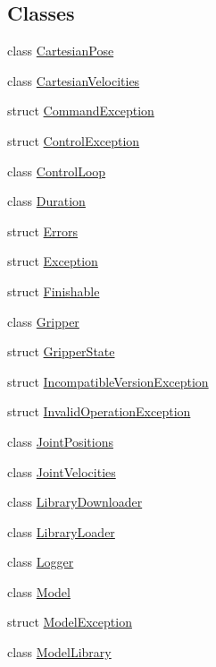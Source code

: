 \subsection*{Classes}
\begin{DoxyCompactItemize}
\item 
class \hyperlink{classfranka_1_1CartesianPose}{Cartesian\+Pose}
\item 
class \hyperlink{classfranka_1_1CartesianVelocities}{Cartesian\+Velocities}
\item 
struct \hyperlink{structfranka_1_1CommandException}{Command\+Exception}
\item 
struct \hyperlink{structfranka_1_1ControlException}{Control\+Exception}
\item 
class \hyperlink{classfranka_1_1ControlLoop}{Control\+Loop}
\item 
class \hyperlink{classfranka_1_1Duration}{Duration}
\item 
struct \hyperlink{structfranka_1_1Errors}{Errors}
\item 
struct \hyperlink{structfranka_1_1Exception}{Exception}
\item 
struct \hyperlink{structfranka_1_1Finishable}{Finishable}
\item 
class \hyperlink{classfranka_1_1Gripper}{Gripper}
\item 
struct \hyperlink{structfranka_1_1GripperState}{Gripper\+State}
\item 
struct \hyperlink{structfranka_1_1IncompatibleVersionException}{Incompatible\+Version\+Exception}
\item 
struct \hyperlink{structfranka_1_1InvalidOperationException}{Invalid\+Operation\+Exception}
\item 
class \hyperlink{classfranka_1_1JointPositions}{Joint\+Positions}
\item 
class \hyperlink{classfranka_1_1JointVelocities}{Joint\+Velocities}
\item 
class \hyperlink{classfranka_1_1LibraryDownloader}{Library\+Downloader}
\item 
class \hyperlink{classfranka_1_1LibraryLoader}{Library\+Loader}
\item 
class \hyperlink{classfranka_1_1Logger}{Logger}
\item 
class \hyperlink{classfranka_1_1Model}{Model}
\item 
struct \hyperlink{structfranka_1_1ModelException}{Model\+Exception}
\item 
class \hyperlink{classfranka_1_1ModelLibrary}{Model\+Library}
\item 

\end{DoxyCompactItemize}
